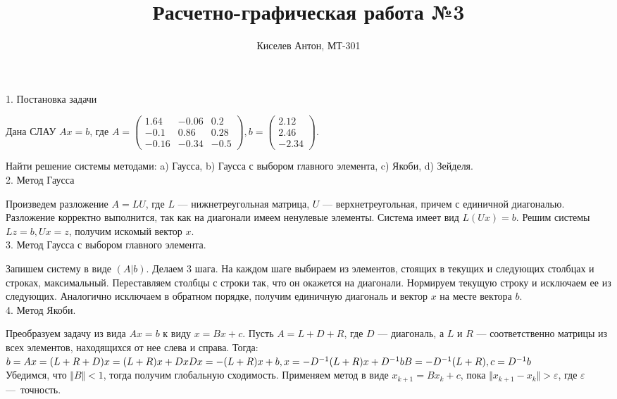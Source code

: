 \documentclass{article}
\title{Расчетно-графическая работа №3}
\author{Киселев Антон, МТ-301}
\date{}
\begin{document}
  \maketitle

    1. Постановка задачи

 	Дана СЛАУ $Ax = b$,  где $A =
	\left( \begin{array}{rrr}
 	1.64 & -0.06 & 0.2 \\
	 -0.1 & 0.86 & 0.28 \\
	-0.16 & -0.34 & -0.5 \end{array} \right),  
	  b = \left( \begin{array}{r} 2.12\\ 2.46\\ -2.34 \end{array} \right)$.

	Найти решение системы методами: a) Гаусса, b) Гаусса с выбо\-ром гла\-вного элемента, c) Якоби, d) Зейделя. \\
	
	2. Метод Гаусса
	
	Произведем разложение $A = LU$, где $L$ — нижнетреугольная матри\-ца, $U$ — верхнетреугольная, причем с единичной диагональю. Разло\-жение корректно выполни\-тся, так как на диагонали имеем ненулевые элементы. Система имеет вид $L(Ux) = b$. Решим системы $Lz = b, Ux = z$, получим искомый вектор $x$.\\
	
	3. Метод Гаусса с выбором главного элемента.
	
	Запишем систему в виде $\left( A|b\right)$. Делаем 3 шага. На каждом шаге выби\-раем из элементов, стоящих в текущих и следующих столбцах и стро\-ках, макси\-мальный. Переставляем столбцы с строки так, что он окаже\-тся на диагонали. Нормируем текущую строку и исключаем ее из следующих. Аналогично исключаем в обратном порядке, получим единичную диаго\-наль и вектор $x$ на месте вектора $b$.\\
	
	4. Метод Якоби.
	
	Преобразуем задачу из вида $Ax = b$ к виду $x = Bx+c$. Пусть $A = L + D + R$, где $D$ — диагональ, а $L$ и $R$ — соответственно матрицы из всех элементов, находящихся от нее слева и справа. Тогда: \\ $b = Ax = (L+R+D)x = (L+R)x + Dx\\ Dx = -(L+R)x + b, x = -D^{-1}(L+R)x+D^{-1}b\\ B = -D^{-1}(L+R), c = D^{-1}b$\\
	Убедимся, что $\Vert B \Vert < 1$, тогда получим глобальную сходимость. Применяем метод в виде $x_{k+1} = Bx_{k} + c$, пока $\Vert x_{k+1} - x_{k} \Vert > \varepsilon$, где $\varepsilon$ — точность.\\
	
\end{document}
